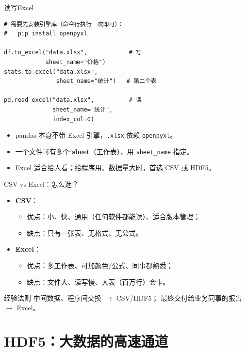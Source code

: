 \documentclass[9pt]{ctexbeamer}
\begin{document}
\begin{frame}[fragile]{读写Excel}
	\begin{lstlisting}
# 需要先安装引擎库（命令行执行一次即可）：
#   pip install openpyxl

df.to_excel("data.xlsx",            # 写
            sheet_name="价格")
stats.to_excel("data.xlsx",
               sheet_name="统计")   # 第二个表

pd.read_excel("data.xlsx",          # 读
              sheet_name="统计",
              index_col=0)
\end{lstlisting}
	\begin{itemize}
		\item pandas 本身不带 Excel 引擎，\texttt{.xlsx} 依赖 \texttt{openpyxl}。
		\item 一个文件可有多个 \textbf{sheet}（工作表），用 \texttt{sheet\_name} 指定。
		\item Excel 适合给人看；给程序用、数据量大时，首选 CSV 或 HDF5。
	\end{itemize}
\end{frame}

\begin{frame}{CSV vs Excel：怎么选？}
	\begin{itemize}
		\item \textbf{CSV}：
		\begin{itemize}
			\item 优点：小、快、通用（任何软件都能读）、适合版本管理；
			\item 缺点：只有一张表、无格式、无公式。
		\end{itemize}
		\item \textbf{Excel}：
		\begin{itemize}
			\item 优点：多工作表、可加颜色/公式、同事都熟悉；
			\item 缺点：文件大、读写慢、大表（百万行）会卡。
		\end{itemize}
	\end{itemize}
	\begin{block}{经验法则}
		中间数据、程序间交换 $\to$ CSV/HDF5；
		最终交付给业务同事的报告 $\to$ Excel。
	\end{block}
\end{frame}


\section{HDF5：大数据的高速通道}
\end{document}
